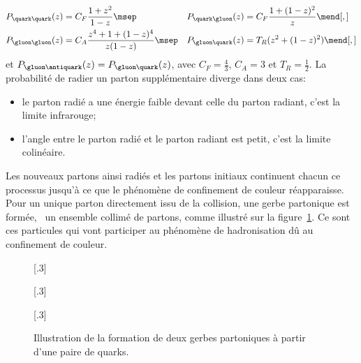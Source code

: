 \begin{align}
P_{\quark\quark}(z) &= C_F \frac{1+z^2}{1-z} \msep&
P_{\quark\gluon}(z) &= C_F \frac{1+(1-z)^2}{z} \mend[,]
\\
P_{\gluon\gluon}(z) &= C_A \frac{z^4 + 1 + (1-z)^4}{z(1-z)} \msep&
P_{\gluon\quark}(z) &= T_R (z^2+(1-z)^2) \mend[,]
\end{align}
et $P_{\gluon\antiquark}(z) = P_{\gluon\quark}(z)$,
avec
$C_F=\frac{4}{3}$,
$C_A = 3$ et
$T_R=\frac{1}{2}$.
La probabilité de radier un parton supplémentaire diverge dans deux cas:
\begin{itemize}
\item le parton radié a une énergie faible devant celle du parton radiant, c'est la limite infrarouge;
\item l'angle entre le parton radié et le parton radiant est petit, c'est la limite colinéaire.
\end{itemize}
\par Les nouveaux partons ainsi radiés et les partons initiaux continuent chacun ce processus jusqu'à ce que le phénomène de confinement de couleur réapparaisse. Pour un unique parton directement issu de la collision, une gerbe partonique est formée, \ie\ un ensemble collimé de partons, comme illustré sur la figure~\ref{fig-parton_shower}.
Ce sont ces particules qui vont participer au phénomène de hadronisation dû au confinement de couleur.
\begin{figure}[h]
\centering
{}[.3\textwidth]
{\begin{tikzpicture}

\end{tikzpicture}}
\hfill
{}[.3\textwidth]
{\begin{tikzpicture}


\end{tikzpicture}}
\hfill
{}[.3\textwidth]
{\begin{tikzpicture}



\end{tikzpicture}}

\caption[Formation de deux gerbes partoniques.]{Illustration de la formation de deux gerbes partoniques à partir d'une paire de quarks.}
\label{fig-parton_shower}
\end{figure}

